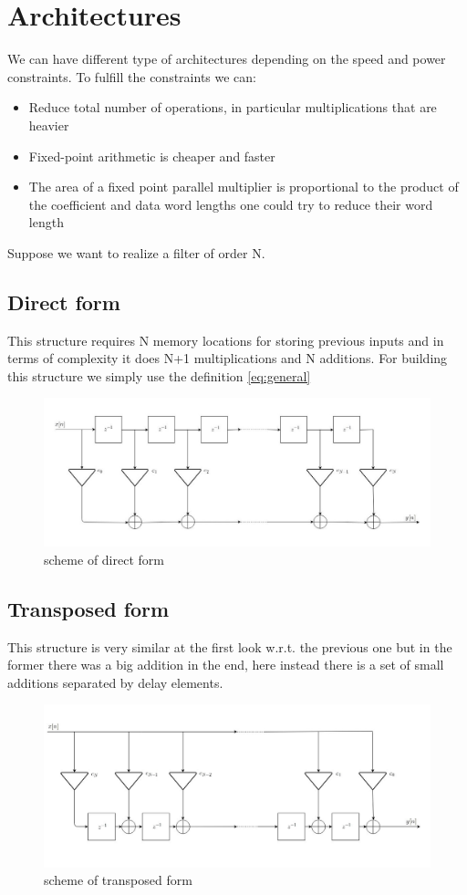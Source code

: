 \section{Architectures}
We can have different type of architectures depending on the speed and power constraints.
To fulfill the constraints we can:\\
\begin{itemize}
    \item Reduce total number of operations, in particular multiplications that are heavier
    \item Fixed-point arithmetic is cheaper and faster
    \item The area of a fixed point parallel multiplier is proportional to the product of the coefficient and data word lengths one could try to reduce their word length
\end{itemize}
Suppose we want to realize a filter of order N.
\subsection{Direct form}
This structure requires N memory locations for storing previous inputs and in terms of complexity it does N+1 multiplications and  N additions.  For building this structure we simply use the definition \ref{eq:general}
\begin{figure}[H]
    \centering
    \includegraphics[scale=0.45]{images/direct.jpeg}    
    \caption{scheme of direct form}
    \label{fig:my_label}
\end{figure}
\subsection{Transposed form}
This structure is very similar at the first look w.r.t. the previous one but in the former there was a big addition in the end, here instead there is a set of small additions separated by delay elements.
\begin{figure}[H]
    \centering
    \includegraphics[scale=0.45]{images/transposed.jpg}    
    \caption{scheme of transposed form}
    \label{fig:transposed}
\end{figure}
